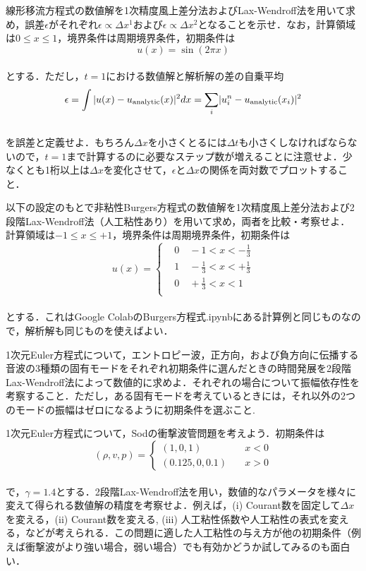 \documentclass[10pt,a4j]{jarticle}
\renewcommand{\labelenumi}{(-\arabic{enumi})}
\renewenvironment{enumerate}%
{%
\begin{list}{(\arabic{enumi})}
{%
  \usecounter{enumi}
  \setlength{\topsep}{0.0em}
  \setlength{\parskip}{0.0em}
  \setlength{\parsep}{0.0em}
  \setlength{\itemsep}{0.25em}
  \setlength{\itemindent}{1zw}
  \setlength{\leftmargin}{2zw}
  \setlength{\rightmargin}{0zw}
  \setlength{\labelsep}{0.5zw}
  \setlength{\labelwidth}{1zw}
  \setlength{\listparindent}{0zw}
}
}{%
\end{list}%
}
\begin{document}
\begin{enumerate}
\def\labelenumi{.}
\item
  線形移流方程式の数値解を1次精度風上差分法およびLax-Wendroff法を用いて求め，誤差\(\epsilon\)がそれぞれ\(\epsilon \propto \Delta x^1\)および\(\epsilon \propto \Delta x^2\)となることを示せ．なお，計算領域は\(0 \leq x \leq 1\)，境界条件は周期境界条件，初期条件は\\
  \[
  u(x) = \sin \left ( 2 \pi x \right)
  \]\\
  とする．ただし，\(t = 1\)における数値解と解析解の差の自乗平均\\
  \[
  \epsilon =
  \int \vert u(x) - u_{\rm analytic}(x) \rvert^2 dx =
  \sum_{i} \lvert u_{i}^{n} - u_{\rm analytic}(x_i) \rvert^2
  \]\\
  を誤差と定義せよ．もちろん\(\Delta x\)を小さくとるには\(\Delta t\)も小さくしなければならないので，\(t = 1\)まで計算するのに必要なステップ数が増えることに注意せよ．少なくとも1桁以上は\(\Delta x\)を変化させて，\(\epsilon\)と\(\Delta x\)の関係を両対数でプロットすること．
\item
  以下の設定のもとで非粘性Burgers方程式の数値解を1次精度風上差分法および2段階Lax-Wendroff法（人工粘性あり）を用いて求め，両者を比較・考察せよ．\\
  計算領域は\(-1 \leq x \leq +1\)，境界条件は周期境界条件，初期条件は\\
  \[
  u(x) =
  \begin{cases}
  & 0 \quad -1 < x < -\frac{1}{3} \\
  & 1 \quad -\frac{1}{3} < x < +\frac{1}{3} \\
  & 0 \quad +\frac{1}{3} < x < 1 \\
  \end{cases}
  \]\\
  とする．これはGoogle
  ColabのBurgers方程式.ipynbにある計算例と同じものなので，解析解も同じものを使えばよい．
\item
  1次元Euler方程式について，エントロピー波，正方向，および負方向に伝播する音波の3種類の固有モードをそれぞれ初期条件に選んだときの時間発展を2段階Lax-Wendroff法によって数値的に求めよ．それぞれの場合について振幅依存性を考察すること．ただし，ある固有モードを考えているときには，それ以外の2つのモードの振幅はゼロになるように初期条件を選ぶこと.
\item
  1次元Euler方程式について，Sodの衝撃波管問題を考えよう．初期条件は\\
  \[
  (\rho, v, p)
  =
  \begin{cases}
  (1, 0, 1) \quad & x < 0
  \\
  (0.125, 0, 0.1) \quad & x > 0
  \end{cases}
  \]\\
  で，\(\gamma = 1.4\)とする．2段階Lax-Wendroff法を用い，数値的なパラメータを様々に変えて得られる数値解の精度を考察せよ．例えば，(i)
  Courant数を固定して\(\Delta x\)を変える，(ii) Courant数を変える, (iii)
  人工粘性係数や人工粘性の表式を変える，などが考えられる．この問題に適した人工粘性の与え方が他の初期条件（例えば衝撃波がより強い場合，弱い場合）でも有効かどうか試してみるのも面白い．
\end{enumerate}
\end{document}
